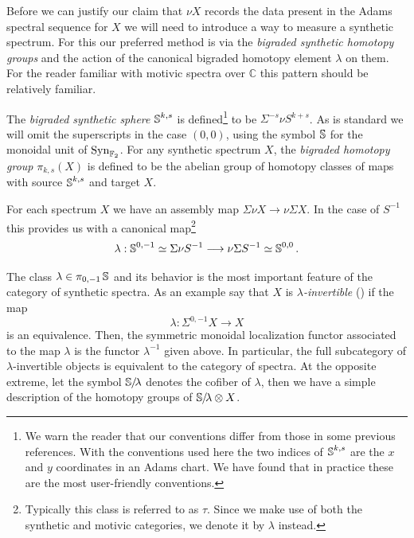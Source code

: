 Before we can justify our claim that $\nu X$ records the data present in the Adams spectral sequence for $X$ we will need to introduce a way to measure a synthetic spectrum.
For this our preferred method is via the \emph{bigraded synthetic homotopy groups} and the action of the canonical bigraded homotopy element $\lambda$ on them. For the reader familiar with motivic spectra over $\mathbb{C}$ this pattern should be relatively familiar.

\begin{dfn}
  The \emph{bigraded synthetic sphere} $\operatorname{\mathbb{S}}^{k,s}$ is defined\footnote{We warn the reader that our conventions differ from those in some previous references. With the conventions used here the two indices of $\operatorname{\mathbb{S}}^{k,s}$ are the $x$ and $y$ coordinates in an Adams chart. We have found that in practice these are the most user-friendly conventions.} to be $\Sigma^{-s} \nu S^{k+s}$.
  As is standard we will omit the superscripts in the case $(0,0)$, using the symbol $\operatorname{\mathbb{S}}$ for the monoidal unit of $\mathrm{Syn}_{\operatorname{\mathbb{F}}_2}$.
  For any synthetic spectrum $X$, the \emph{bigraded homotopy group} $\pi_{k,s}(X)$ is defined to be the abelian group of homotopy classes of maps with source $\operatorname{\mathbb{S}}^{k,s}$ and target $X$.
\end{dfn}
  
\begin{dfn}
  For each spectrum $X$ we have an assembly map $\Sigma \nu X \to \nu \Sigma X$.
  In the case of $S^{-1}$ this provides us with a canonical map\footnote{Typically this class is referred to as $\tau$. Since we make use of both the synthetic and motivic categories, we denote it by $\lambda$ instead.}%
  \[ \lambda : \operatorname{\mathbb{S}}^{0,-1} \simeq \Sigma \nu S^{-1} \longrightarrow \nu \Sigma S^{-1} \simeq \operatorname{\mathbb{S}}^{0,0}. \]
\end{dfn}

The class $\lambda \in \pi_{0,-1} \operatorname{\mathbb{S}}$ and its behavior is the most important feature of the category of synthetic spectra. As an example say that $X$ is \emph{$\lambda$-invertible} (\cite[Definition 4.32]{Pstragowski}) if the map $$\lambda: \Sigma^{0,-1} X \to X$$ is an equivalence. Then, the symmetric monoidal localization functor associated to the map $\lambda$ is the functor $\lambda^{-1}$ given above. In particular, the full subcategory of $\lambda$-invertible objects is equivalent to the category of spectra.
At the opposite extreme,
let the symbol $\operatorname{\mathbb{S}}\hspace{-2.2pt}/\!\lambda$ denotes the cofiber of $\lambda$,
then we have a simple description of the homotopy groups of $\operatorname{\mathbb{S}}\hspace{-2.2pt}/\!\lambda \otimes X$. 

